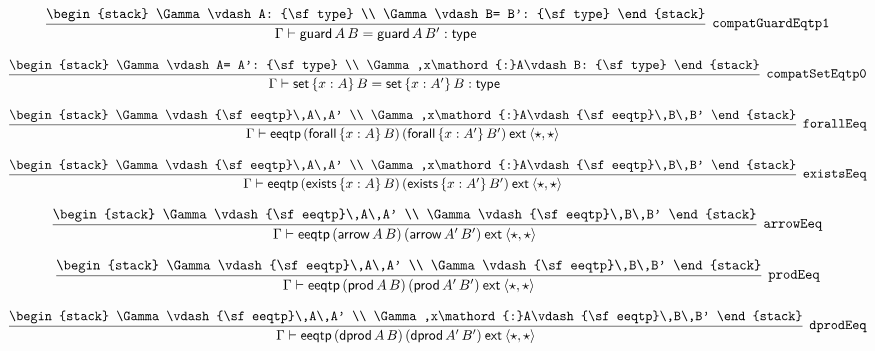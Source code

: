 \[
\infer[{\tt compatGuardEqtp1}]{\Gamma \vdash {\sf guard}\,A\,B= {\sf guard}\,A\,B': {\sf type}}{
\begin{stack}
\Gamma \vdash A: {\sf type}
\\
\Gamma \vdash B= B': {\sf type}
\end{stack}}
\]

\[
\infer[{\tt compatSetEqtp0}]{\Gamma \vdash {\sf set}\,\{x : A\}\,B= {\sf set}\,\{x : A'\}\,B: {\sf type}}{
\begin{stack}
\Gamma \vdash A= A': {\sf type}
\\
\Gamma ,x\mathord{:}A\vdash B: {\sf type}
\end{stack}}
\]

\[
\infer[{\tt forallEeq}]{\Gamma \vdash {\sf eeqtp}\,({\sf forall}\,\{x : A\}\,B)\,({\sf forall}\,\{x : A'\}\,B')\:{\sf ext}\:\langle \star ,\star \rangle }{
\begin{stack}
\Gamma \vdash {\sf eeqtp}\,A\,A'
\\
\Gamma ,x\mathord{:}A\vdash {\sf eeqtp}\,B\,B'
\end{stack}}
\]

\[
\infer[{\tt existsEeq}]{\Gamma \vdash {\sf eeqtp}\,({\sf exists}\,\{x : A\}\,B)\,({\sf exists}\,\{x : A'\}\,B')\:{\sf ext}\:\langle \star ,\star \rangle }{
\begin{stack}
\Gamma \vdash {\sf eeqtp}\,A\,A'
\\
\Gamma ,x\mathord{:}A\vdash {\sf eeqtp}\,B\,B'
\end{stack}}
\]

\[
\infer[{\tt arrowEeq}]{\Gamma \vdash {\sf eeqtp}\,({\sf arrow}\,A\,B)\,({\sf arrow}\,A'\,B')\:{\sf ext}\:\langle \star ,\star \rangle }{
\begin{stack}
\Gamma \vdash {\sf eeqtp}\,A\,A'
\\
\Gamma \vdash {\sf eeqtp}\,B\,B'
\end{stack}}
\]

\[
\infer[{\tt prodEeq}]{\Gamma \vdash {\sf eeqtp}\,({\sf prod}\,A\,B)\,({\sf prod}\,A'\,B')\:{\sf ext}\:\langle \star ,\star \rangle }{
\begin{stack}
\Gamma \vdash {\sf eeqtp}\,A\,A'
\\
\Gamma \vdash {\sf eeqtp}\,B\,B'
\end{stack}}
\]

\[
\infer[{\tt dprodEeq}]{\Gamma \vdash {\sf eeqtp}\,({\sf dprod}\,A\,B)\,({\sf dprod}\,A'\,B')\:{\sf ext}\:\langle \star ,\star \rangle }{
\begin{stack}
\Gamma \vdash {\sf eeqtp}\,A\,A'
\\
\Gamma ,x\mathord{:}A\vdash {\sf eeqtp}\,B\,B'
\end{stack}}
\]

